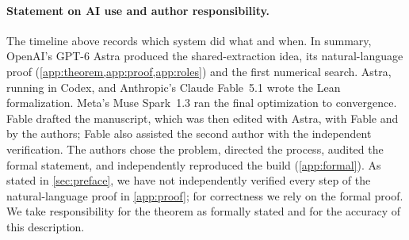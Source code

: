 \documentclass[11pt,a4paper]{article}
\begin{document}
\paragraph{Statement on AI use and author responsibility.}
The timeline above records which system did what and when. In summary, OpenAI's GPT-6 Astra produced the shared-extraction idea, its natural-language proof (\cref{app:theorem,app:proof,app:roles}) and the first numerical search. Astra, running in Codex, and Anthropic's Claude Fable~5.1 wrote the Lean formalization. Meta's Muse Spark~1.3 ran the final optimization to convergence. Fable drafted the manuscript, which was then edited with Astra, with Fable and by the authors; Fable also assisted the second author with the independent verification. The authors chose the problem, directed the process, audited the formal statement, and independently reproduced the build (\cref{app:formal}). As stated in \cref{sec:preface}, we have not independently verified every step of the natural-language proof in \cref{app:proof}; for correctness we rely on the formal proof. We take responsibility for the theorem as formally stated and for the accuracy of this description.
\end{document}
